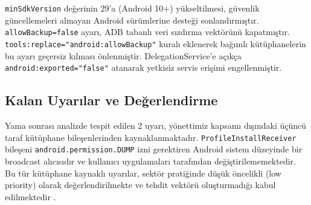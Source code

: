 \begin{table}[!ht]
    \centering
    \caption{Güvenlik Yamaları Öncesi ve Sonrası Karşılaştırma}
    \label{tab:security_comparison}
\end{table}

\texttt{minSdkVersion} değerinin 29'a (Android 10+) yükseltilmesi, güvenlik güncellemeleri almayan Android sürümlerine desteği sonlandırmıştır. \texttt{allowBackup=false} ayarı, ADB tabanlı veri sızdırma vektörünü kapatmıştır. \texttt{tools:replace="android:allowBackup"} kuralı eklenerek bağımlı kütüphanelerin bu ayarı geçersiz kılması önlenmiştir. DelegationService'e açıkça \texttt{android:exported="false"} atanarak yetkisiz servis erişimi engellenmiştir.

\subsection{Kalan Uyarılar ve Değerlendirme}

Yama sonrası analizde tespit edilen 2 uyarı, yönettimiz kapsamı dışındaki üçüncü taraf kütüphane bileşenlerinden kaynaklanmaktadır. \texttt{ProfileInstallReceiver} bileşeni \texttt{android.permission.DUMP} izni gerektiren Android sistem düzeyinde bir broadcast alıcısıdır ve kullanıcı uygulamaları tarafından değiştirilememektedir. Bu tür kütüphane kaynaklı uyarılar, sektör pratiğinde düşük öncelikli (low priority) olarak değerlendirilmekte ve tehdit vektörü oluşturmadığı kabul edilmektedir \cite{al2018mobile}.
